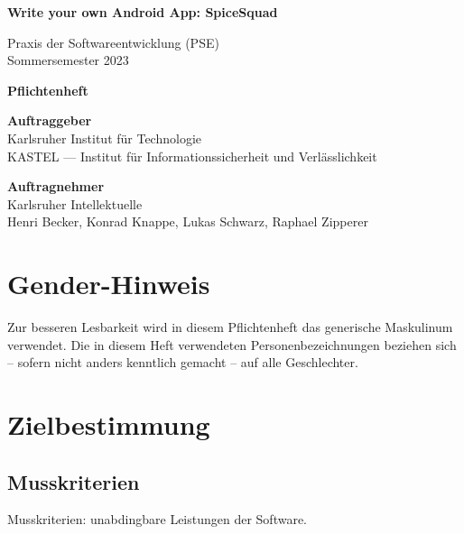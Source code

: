 \documentclass[parskip=full]{scrartcl}
\begin{document}


\begin{titlepage}
    \begin{center}
        \begin{Huge}
            {\textbf{Write your own Android App: SpiceSquad}}
        \end{Huge}
        \vspace{12px}

        Praxis der Softwareentwicklung (PSE)\\
        Sommersemester 2023\\
        \vspace{150px}

        \begin{Huge}
            {\textbf{Pflichtenheft}}
        \end{Huge}
        \vspace{12px}

        \textbf{Auftraggeber}\\
        Karlsruher Institut für Technologie\\
        KASTEL — Institut für Informationssicherheit und Verlässlichkeit\\
        \vspace{330px}

        \textbf{Auftragnehmer}\\
        Karlsruher Intellektuelle\\
        Henri Becker, Konrad Knappe, Lukas Schwarz, Raphael Zipperer\\
    \end{center}
\end{titlepage}

\tableofcontents
\newpage

\section*{Gender-Hinweis}
Zur besseren Lesbarkeit wird in diesem Pflichtenheft das generische Maskulinum verwendet.
Die in diesem Heft verwendeten Personenbezeichnungen beziehen sich – sofern nicht anders kenntlich gemacht – auf alle Geschlechter.
\newpage

\section{Zielbestimmung}
\subsection{Musskriterien}
Musskriterien: unabdingbare Leistungen der Software.
\end{document}
